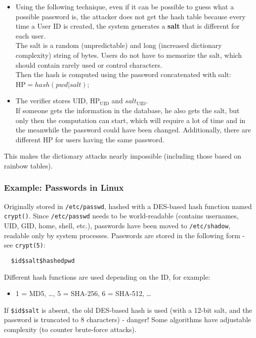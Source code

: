 \begin{itemize}
  \item Using the following technique, even if it can be possible to guess what a possible password is, the attacker
        does not get the hash table because every time a User ID is created, the system generates a \textbf{salt} that is different for each user.\\
        The salt is a random (unpredictable) and long (increased dictionary complexity) string of bytes.
        Users do not have to memorize the salt, which should contain rarely used or control characters.\\
        Then the hash is computed using the password concatenated with salt:\\
        $\mathrm{HP} = hash(pwd | salt)$;
  \item The verifier stores UID,
        $\mathrm{HP}_{\mathrm{UID}}$ and $salt_{\mathrm{UID}}$.\\
        If someone gets the information in the database, he also gets the salt, but only then the
        computation can start, which will require a lot of time and in the meanwhile the password could have been
        changed. Additionally, there are different HP for users having the same password.
\end{itemize}

This makes the dictionary attacks nearly impossible (including those based on rainbow tables).


\subsubsection{Example: Passwords in Linux}
Originally stored in \texttt{/etc/passwd}, hashed with a DES-based
hash function named \texttt{crypt()}.
Since \texttt{/etc/passwd} needs to be world-readable (contains
usernames, UID, GID, home, shell, etc.), passwords have been
moved to \texttt{/etc/shadow}, readable only by system processes.
Passwords are stored in the following form - see \texttt{crypt(5)}:

\begin{verbatim}
  $id$salt$hashedpwd
\end{verbatim}
Different hash functions are used depending on the ID, for example:
\begin{itemize}
  \item 1 = MD5, \ldots, 5 = SHA-256, 6 = SHA-512, \ldots
\end{itemize}
If \texttt{\$id\$salt} is absent, the old DES-based hash is used (with
a 12-bit salt, and the password is truncated to 8 characters) - danger!
Some algorithms have adjustable complexity (to counter brute-force attacks).


